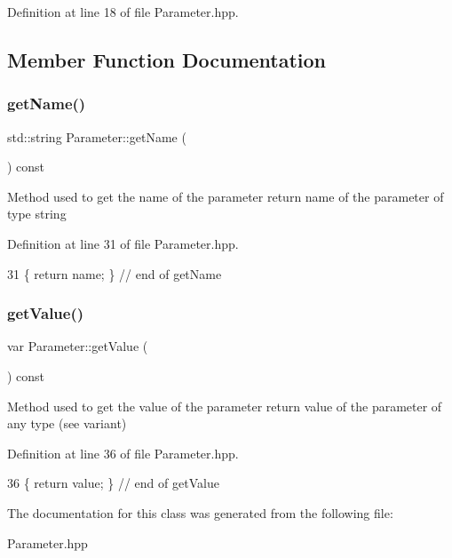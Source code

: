 Definition at line 18 of file Parameter.\+hpp.



\subsection{Member Function Documentation}
\mbox{\label{classParameter_a6687b858b004ed892c764f86b9a1c965}} 
\subsubsection{\texorpdfstring{get\+Name()}{getName()}}
{\footnotesize\ttfamily std\+::string Parameter\+::get\+Name (\begin{DoxyParamCaption}{ }\end{DoxyParamCaption}) const\hspace{0.3cm}{\ttfamily [inline]}}

Method used to get the name of the parameter return name of the parameter of type string 

Definition at line 31 of file Parameter.\+hpp.


\begin{DoxyCode}
31 \{ \textcolor{keywordflow}{return} name; \}  \textcolor{comment}{// end of getName}
\end{DoxyCode}
\mbox{\label{classParameter_acb6003c8455f06d2191af29524142b16}} 
\subsubsection{\texorpdfstring{get\+Value()}{getValue()}}
{\footnotesize\ttfamily var Parameter\+::get\+Value (\begin{DoxyParamCaption}{ }\end{DoxyParamCaption}) const\hspace{0.3cm}{\ttfamily [inline]}}

Method used to get the value of the parameter return value of the parameter of any type (see variant) 

Definition at line 36 of file Parameter.\+hpp.


\begin{DoxyCode}
36 \{ \textcolor{keywordflow}{return} value; \}  \textcolor{comment}{// end of getValue}
\end{DoxyCode}


The documentation for this class was generated from the following file\+:\begin{DoxyCompactItemize}
\item 
Parameter.\+hpp\end{DoxyCompactItemize}
